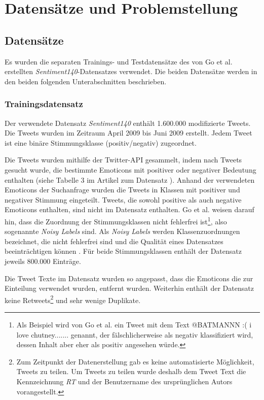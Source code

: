 \section{Datensätze und Problemstellung}\label{sec:datensätzeundproblemstellung}

\subsection{Datensätze}

Es wurden die separaten Trainings- und Testdatensätze des von Go et al. \cite{go2009twitter} erstellten \textit{Sentiment140}-Datensatzes verwendet.
Die beiden Datensätze werden in den beiden folgenden Unterabschnitten beschrieben.

\subsubsection{Trainingsdatensatz}\label{subsec:trainingsdatensatz}
Der verwendete Datensatz \textit{Sentiment140} enthält 1.600.000 modifizierte Tweets.
Die Tweets wurden im Zeitraum April 2009 bis Juni 2009 erstellt.
Jedem Tweet ist eine binäre Stimmungsklasse (positiv/negativ) zugeordnet.

Die Tweets wurden mithilfe der Twitter-API gesammelt, indem nach Tweets gesucht wurde, die bestimmte Emoticons mit positiver oder negativer Bedeutung enthalten (siehe Tabelle 3 im Artikel zum Datensatz \cite[S. 4]{go2009twitter}).
Anhand der verwendeten Emoticons der Suchanfrage wurden die Tweets in Klassen mit positiver und negativer Stimmung eingeteilt.
Tweets, die sowohl positive als auch negative Emoticons enthalten, sind nicht im Datensatz enthalten.
Go et al. \cite{go2009twitter} weisen darauf hin, dass die Zuordnung der Stimmungsklassen nicht fehlerfrei ist\footnote{
    Als Beispiel wird von Go et al. \cite{go2009twitter} ein Tweet mit dem Text \glqq @BATMANNN :( i love chutney.......\grqq{} genannt, der fälschlicherweise als negativ klassifiziert wird, dessen Inhalt aber eher als positiv angesehen würde.
}, also sogenannte \textit{Noisy Labels} sind.
Als \textit{Noisy Labels} werden Klassenzuordnungen bezeichnet, die nicht fehlerfrei sind und die Qualität eines Datensatzes beeinträchtigen können \cite{song2022learning}.
Für beide Stimmungsklassen enthält der Datensatz jeweils 800.000 Einträge.

Die Tweet Texte im Datensatz wurden so angepasst, dass die Emoticons die zur Einteilung verwendet wurden, entfernt wurden.
Weiterhin enthält der Datensatz keine Retweets\footnote{
    Zum Zeitpunkt der Datenerstellung gab es keine automatisierte Möglichkeit, Tweets zu teilen.
    Um Tweets zu teilen wurde deshalb dem Tweet Text die Kennzeichnung \textit{RT} und der Benutzername des ursprünglichen Autors vorangestellt.
} und sehr wenige Duplikate.

